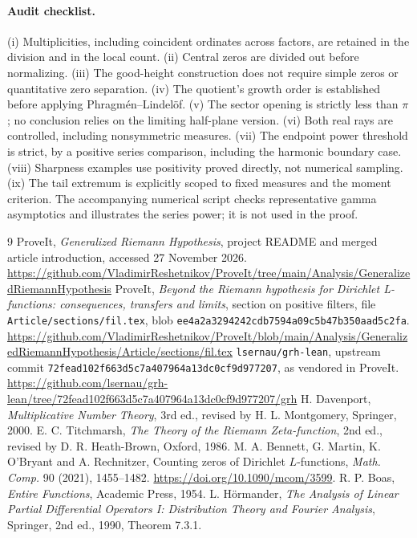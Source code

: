 \documentclass[11pt]{article}
\theoremstyle{definition}\newtheorem{definition}[theorem]{Definition}
\theoremstyle{remark}\newtheorem{remark}[theorem]{Remark}
\begin{document}
\paragraph{Audit checklist.} (i) Multiplicities, including coincident ordinates across factors, are retained in the division and in the local count. (ii) Central zeros are divided out before normalizing. (iii) The good-height construction does not require simple zeros or quantitative zero separation. (iv) The quotient's growth order is established before applying Phragm\'en--Lindel\"of. (v) The sector opening is strictly less than $\pi$; no conclusion relies on the limiting half-plane version. (vi) Both real rays are controlled, including nonsymmetric measures. (vii) The endpoint power threshold is strict, by a positive series comparison, including the harmonic boundary case. (viii) Sharpness examples use positivity proved directly, not numerical sampling. (ix) The tail extremum is explicitly scoped to fixed measures and the moment criterion. The accompanying numerical script checks representative gamma asymptotics and illustrates the series power; it is not used in the proof.

\begin{thebibliography}{9}
 ProveIt, \emph{Generalized Riemann Hypothesis}, project README and merged article introduction, accessed 27 November 2026. \url{https://github.com/VladimirReshetnikov/ProveIt/tree/main/Analysis/GeneralizedRiemannHypothesis}
 ProveIt, \emph{Beyond the Riemann hypothesis for Dirichlet L-functions: consequences, transfers and limits}, section on positive filters, file \texttt{Article/sections/fil.tex}, blob \texttt{ee4a2a3294242cdb7594a09c5b47b350aad5c2fa}. \url{https://github.com/VladimirReshetnikov/ProveIt/blob/main/Analysis/GeneralizedRiemannHypothesis/Article/sections/fil.tex}
 \texttt{lsernau/grh-lean}, upstream commit \texttt{72fead102f663d5c7a407964a13dc0cf9d977207}, as vendored in ProveIt. \url{https://github.com/lsernau/grh-lean/tree/72fead102f663d5c7a407964a13dc0cf9d977207/grh}
 H. Davenport, \emph{Multiplicative Number Theory}, 3rd ed., revised by H. L. Montgomery, Springer, 2000.
 E. C. Titchmarsh, \emph{The Theory of the Riemann Zeta-function}, 2nd ed., revised by D. R. Heath-Brown, Oxford, 1986.
 M. A. Bennett, G. Martin, K. O'Bryant and A. Rechnitzer, Counting zeros of Dirichlet $L$-functions, \emph{Math. Comp.} 90 (2021), 1455--1482. \url{https://doi.org/10.1090/mcom/3599}.
 R. P. Boas, \emph{Entire Functions}, Academic Press, 1954.
 L. H\"ormander, \emph{The Analysis of Linear Partial Differential Operators I: Distribution Theory and Fourier Analysis}, Springer, 2nd ed., 1990, Theorem 7.3.1.
\end{thebibliography}
\end{document}
